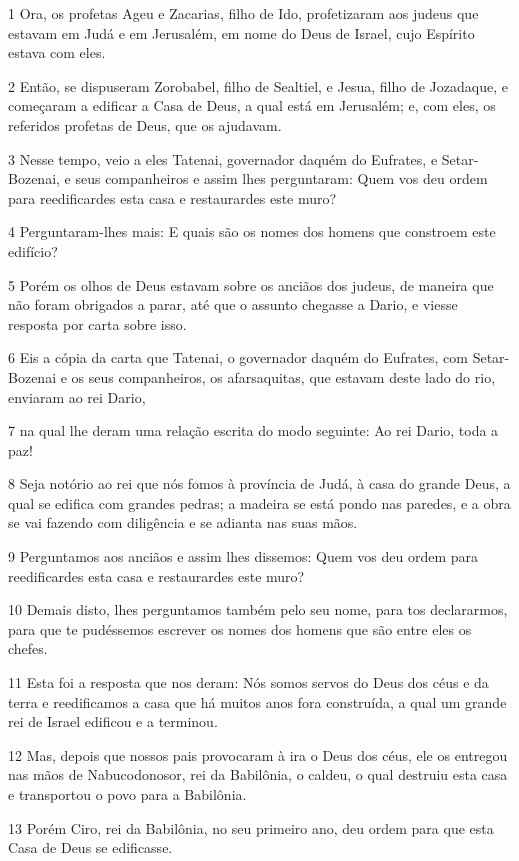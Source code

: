 \par 1 Ora, os profetas Ageu e Zacarias, filho de Ido, profetizaram aos judeus que estavam em Judá e em Jerusalém, em nome do Deus de Israel, cujo Espírito estava com eles.
\par 2 Então, se dispuseram Zorobabel, filho de Sealtiel, e Jesua, filho de Jozadaque, e começaram a edificar a Casa de Deus, a qual está em Jerusalém; e, com eles, os referidos profetas de Deus, que os ajudavam.
\par 3 Nesse tempo, veio a eles Tatenai, governador daquém do Eufrates, e Setar-Bozenai, e seus companheiros e assim lhes perguntaram: Quem vos deu ordem para reedificardes esta casa e restaurardes este muro?
\par 4 Perguntaram-lhes mais: E quais são os nomes dos homens que constroem este edifício?
\par 5 Porém os olhos de Deus estavam sobre os anciãos dos judeus, de maneira que não foram obrigados a parar, até que o assunto chegasse a Dario, e viesse resposta por carta sobre isso.
\par 6 Eis a cópia da carta que Tatenai, o governador daquém do Eufrates, com Setar-Bozenai e os seus companheiros, os afarsaquitas, que estavam deste lado do rio, enviaram ao rei Dario,
\par 7 na qual lhe deram uma relação escrita do modo seguinte: Ao rei Dario, toda a paz!
\par 8 Seja notório ao rei que nós fomos à província de Judá, à casa do grande Deus, a qual se edifica com grandes pedras; a madeira se está pondo nas paredes, e a obra se vai fazendo com diligência e se adianta nas suas mãos.
\par 9 Perguntamos aos anciãos e assim lhes dissemos: Quem vos deu ordem para reedificardes esta casa e restaurardes este muro?
\par 10 Demais disto, lhes perguntamos também pelo seu nome, para tos declararmos, para que te pudéssemos escrever os nomes dos homens que são entre eles os chefes.
\par 11 Esta foi a resposta que nos deram: Nós somos servos do Deus dos céus e da terra e reedificamos a casa que há muitos anos fora construída, a qual um grande rei de Israel edificou e a terminou.
\par 12 Mas, depois que nossos pais provocaram à ira o Deus dos céus, ele os entregou nas mãos de Nabucodonosor, rei da Babilônia, o caldeu, o qual destruiu esta casa e transportou o povo para a Babilônia.
\par 13 Porém Ciro, rei da Babilônia, no seu primeiro ano, deu ordem para que esta Casa de Deus se edificasse.
